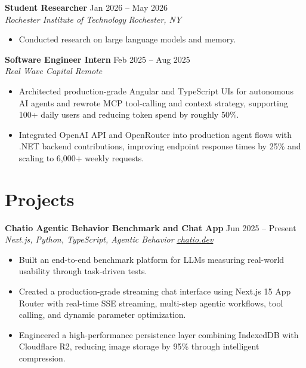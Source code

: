 \documentclass[10pt,letterpaper]{article}
\newcommand{\resumeRole}[4]{%
  \textbf{#1} \hfill #2\\
  \textit{#3} \hfill \textit{#4}
}
\begin{document}
\resumeRole{Student Researcher}{Jan 2026 -- May 2026}{Rochester Institute of Technology}{Rochester, NY}
\begin{itemize}
  \item Conducted research on large language models and memory.
\end{itemize}

\resumeRole{Software Engineer Intern}{Feb 2025 -- Aug 2025}{Real Wave Capital}{Remote}
\begin{itemize}
  \item Architected production-grade Angular and TypeScript UIs for autonomous AI agents and rewrote MCP tool-calling and context strategy, supporting 100+ daily users and reducing token spend by roughly 50\%.
  \item Integrated OpenAI API and OpenRouter into production agent flows with .NET backend contributions, improving endpoint response times by 25\% and scaling to 6,000+ weekly requests.
\end{itemize}

\section*{Projects}
\resumeRole{Chatio Agentic Behavior Benchmark and Chat App}{Jun 2025 -- Present}{Next.js, Python, TypeScript, Agentic Behavior}{\href{https://chatio.dev}{chatio.dev}}
\begin{itemize}
  \item Built an end-to-end benchmark platform for LLMs measuring real-world usability through task-driven tests.
  \item Created a production-grade streaming chat interface using Next.js 15 App Router with real-time SSE streaming, multi-step agentic workflows, tool calling, and dynamic parameter optimization.
  \item Engineered a high-performance persistence layer combining IndexedDB with Cloudflare R2, reducing image storage by 95\% through intelligent compression.
\end{itemize}
\end{document}
